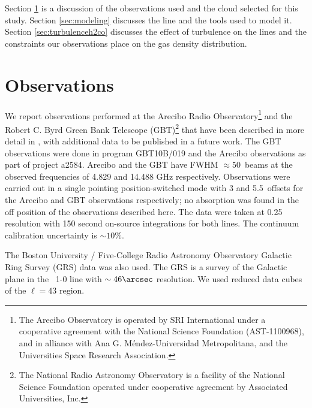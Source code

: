
Section \ref{sec:observations} is a discussion of the observations used and the
cloud selected  for this study.  Section  \ref{sec:modeling} discusses the
\formaldehyde line and the tools used to model it.  Section
\ref{sec:turbulenceh2co} discusses the effect of turbulence on the \formaldehyde
lines and the constraints our observations place on the gas density
distribution.


\section{Observations}
\label{sec:observations}
We report \formaldehyde observations performed at the Arecibo Radio
Observatory\footnote{The Arecibo Observatory is operated by SRI International
under a cooperative agreement with the National Science Foundation
(AST-1100968), and in alliance with Ana G. Méndez-Universidad Metropolitana,
and the Universities Space Research Association.} and the Robert C. Byrd Green
Bank Telescope (GBT)\footnote{The National Radio Astronomy Observatory is a
facility of the National Science Foundation operated under cooperative
agreement by Associated Universities, Inc.} that
have been described in more detail in \citet{Ginsburg2011a}, with additional
data to be published in a future work.  The GBT observations were done in program
GBT10B/019 and the Arecibo observations as part of project a2584.  Arecibo and
the GBT have FWHM $\approx50$\arcsec\ beams at the observed frequencies of
4.829 and 14.488 GHz respectively.  Observations were carried out in a single
pointing position-switched mode with 3 and 5.5\arcmin\ offsets for the Arecibo
and GBT observations respectively; no absorption was found in the off position
of the observations described here.  The data were taken at 0.25 \kms
resolution with 150 second on-source integrations for both lines.  The continuum
calibration uncertainty is $\sim 10\%$.

The Boston University / Five-College Radio Astronomy Observatory Galactic Ring
Survey (GRS) \thirteenco data was also used.  The GRS \citep{Jackson2006a}
is a survey of the Galactic plane in the \thirteenco\ 1-0 line with $\sim
46\arcsec$ resolution.  We used reduced data cubes of the $\ell=43$ region.

